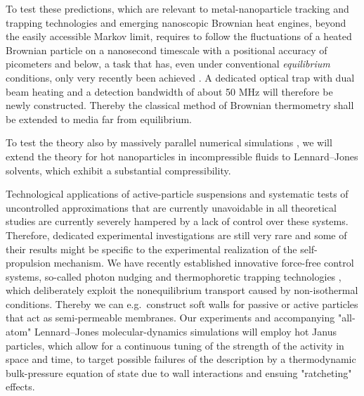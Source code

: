 \begin{workpackage}[id=WPactive,wphases=0-48,
  short=Active Particle Suspensions,%
  title=Probing Active Particle Suspensions with Colloids and Polymers,
  lead=ULEI,
  ULEIRM=96,UNIPDRM=6,USTUTTRM=2]
\begin{tasklist}
\begin{task}[title=Noise Temperature,id=task3,lead=ULEI,wphases=0-24!0.5]
To test these predictions, which are relevant to metal-nanoparticle tracking and trapping technologies and emerging
nanoscopic Brownian heat engines, beyond the easily accessible Markov limit, requires to follow the fluctuations of 
a heated Brownian particle on a nanosecond timescale with a positional accuracy of picometers and below, a task 
that has, even under conventional \emph{equilibrium} conditions, only very recently been achieved \cite{kheifets-etal:2014}.
%
A dedicated optical trap with dual beam heating and a detection bandwidth of about 50 MHz
will therefore be newly constructed. 
%
Thereby the classical method of Brownian thermometry shall be extended to media far from equilibrium.

To test the theory also by massively parallel numerical simulations \cite{chakraborty-etal:2011}, 
we will extend the theory for hot nanoparticles in incompressible fluids 
to Lennard--Jones solvents, which exhibit a substantial compressibility.
\end{task}

\begin{task}[title=Active-Particle Suspensions,id=task4,lead=ULEI,wphases=24-48!0.5]
Technological applications of active-particle suspensions and systematic tests of
uncontrolled approximations that are currently unavoidable in all theoretical studies are
currently severely hampered by a lack of control over these systems.
%
Therefore, dedicated experimental investigations are still very rare and some of their
results might be specific to the experimental realization of the self-propulsion mechanism.
%
We have recently established innovative force-free control systems, so-called photon nudging
and thermophoretic trapping technologies \cite{Qian2013,Braun:NanoLetters:2015}, which deliberately exploit 
the nonequilibrium transport caused by non-isothermal conditions.
%
Thereby we can e.g.\ construct soft walls for passive or active particles that act as
semi-permeable membranes.
%
Our experiments and accompanying "all-atom" Lennard--Jones molecular-dynamics simulations \cite{chakraborty-etal:2011} 
will employ hot Janus particles, which allow for a continuous tuning of the strength of 
the activity in space and time, to target 
possible failures of the description by a thermodynamic bulk-pressure equation of
state \cite{ginot-etal:2015} due to wall interactions and ensuing "ratcheting" effects.
\end{task}


\end{tasklist}


\end{workpackage}
